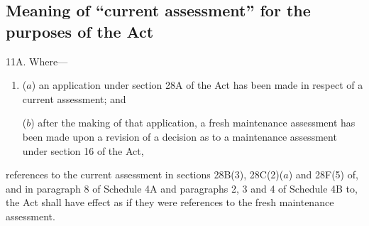 \documentclass[12pt,a4paper]{article}
\begin{document}
\subsection[11A. Meaning of “current assessment” for the purposes of the Act]{Meaning of “current assessment” for the purposes of the Act}

%
%
%
%
%

11A.  Where---
\begin{enumerate}\item[]
($a$) an application under section 28A of the Act has been made in respect of a current assessment; and

($b$) after the making of that application, a fresh maintenance assessment has been made upon a revision of a decision as to a maintenance assessment under section 16 of the Act,
\end{enumerate}
references to the current assessment in sections 28B(3), 28C(2)($a$) and 28F(5) of, and in paragraph 8 of Schedule 4A and paragraphs 2, 3 and 4 of Schedule 4B to, the Act shall have effect as if they were references to the fresh maintenance assessment.
\end{document}
